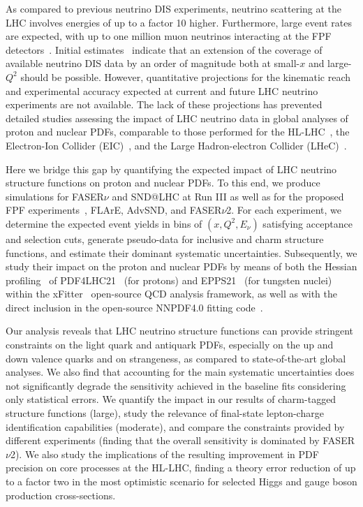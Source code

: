 As compared to  previous neutrino DIS experiments,  neutrino
scattering at the LHC involves energies of up to a factor 10  higher.
%
Furthermore, large event rates are expected, with
up to one million muon neutrinos interacting at the
FPF detectors~\cite{Anchordoqui:2021ghd,Feng:2022inv}.
%
Initial estimates~\cite{Feng:2022inv} indicate that an extension of the coverage of
available neutrino DIS data by an order of magnitude both at small-$x$
and large-$Q^2$ should be possible.
%
However, quantitative projections for the kinematic reach
and experimental accuracy expected at current
and future LHC neutrino experiments are not available.
%
The lack of these projections has prevented detailed studies assessing the impact
of LHC neutrino data in global analyses of proton and nuclear PDFs, comparable to
those performed for the HL-LHC~\cite{AbdulKhalek:2018rok,Azzi:2019yne}, the Electron-Ion Collider (EIC)~\cite{AbdulKhalek:2021gbh,Khalek:2021ulf,AbdulKhalek:2019mzd}, and the
Large Hadron-electron Collider (LHeC)~\cite{AbdulKhalek:2019mps,LHeC:2020van,LHeCStudyGroup:2012zhm}. 

Here we bridge this gap by quantifying
the expected impact of  LHC neutrino structure functions on proton and nuclear PDFs.
%
To this end, we produce simulations for  FASER$\nu$ and SND@LHC at Run III 
as well as for the proposed FPF experiments~\cite{Anchordoqui:2021ghd,Feng:2022inv,Batell:2021blf,Batell:2021aja}, FLArE, AdvSND, and FASER$\nu$2.
%
For each experiment, we determine the expected event yields in bins of $(x,Q^2,E_\nu)$
satisfying acceptance and selection cuts,
generate pseudo-data for  inclusive and charm 
structure functions, 
and estimate their dominant systematic uncertainties.
%
Subsequently, we study their impact on the proton and nuclear PDFs by means of both the Hessian profiling~\cite{Paukkunen:2014zia,  Schmidt:2018hvu, AbdulKhalek:2018rok, HERAFitterdevelopersTeam:2015cre}
of  PDF4LHC21~\cite{PDF4LHCWorkingGroup:2022cjn} (for protons) and EPPS21~\cite{Eskola:2021nhw}
(for tungsten nuclei)
within the {\sc\small xFitter}~\cite{Alekhin:2014irh, Bertone:2017tig, xFitter:2022zjb, xFitter:web} open-source QCD analysis framework,
as well as with the direct inclusion in the open-source NNPDF4.0 fitting code~\cite{NNPDF:2021uiq}.

Our analysis reveals that  LHC neutrino structure functions can provide  stringent constraints
on the light quark and antiquark PDFs, especially on the up and down
valence quarks and on strangeness, as compared to state-of-the-art global analyses.
%
We also  find that accounting for the main systematic uncertainties does not significantly
degrade the sensitivity achieved in the baseline fits considering only statistical errors.
%
We quantify the impact in our results of charm-tagged structure functions (large), study the relevance
of final-state lepton-charge identification capabilities (moderate), and compare the constraints
provided by different experiments (finding that the overall sensitivity is dominated by FASER$\nu$2).
%
We also study the implications of the resulting improvement in PDF precision
on core processes at the HL-LHC, finding a theory error reduction
of up to a factor two in the most optimistic scenario
for selected  Higgs and gauge boson production cross-sections. 

